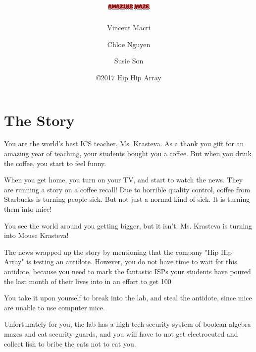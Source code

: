 \documentclass[12pt]{book}
\title{\includegraphics[width=\textwidth]{GameLogo}}
\author{Vincent Macri \and Chloe Nguyen \and Susie Son}
\date{\copyright 2017 Hip Hip Array}
\begin{document}
	\maketitle
	\begingroup
		\frontmatter
		\let\cleardoublepage\clearpage
		\tableofcontents
		\mainmatter
	\endgroup
	\chapter{The Story}
		You are the world's best ICS teacher, Ms. Krasteva. As a thank you gift for an amazing year of teaching, your students bought you a coffee. But when you drink the coffee, you start to feel funny.

		When you get home, you turn on your TV, and start to watch the news. They are running a story on a coffee recall! Due to horrible quality control, coffee from Starbucks is turning people sick. But not just a normal kind of sick. It is turning them into mice!

		You see the world around you getting bigger, but it isn't. Ms. Krasteva is turning into Mouse Krasteva!

		The news wrapped up the story by mentioning that the company "Hip Hip Array" is testing an antidote. However, you do not have time to wait for this antidote, because you need to mark the fantastic ISPs your students have poured the last month of their lives into in an effort to get 100%

		You take it upon yourself to break into the lab, and steal the antidote, since mice are unable to use computer mice.

		Unfortunately for you, the lab has a high-tech security system of boolean algebra mazes and cat security guards, and you will have to not get electrocuted and collect fish to bribe the cats not to eat you.
\end{document}
